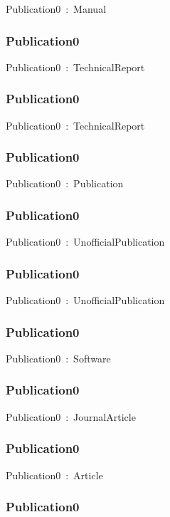 \documentclass{article}
\begin{document}
Publication0~:~Manual

\subsubsection*{Publication0}

Publication0~:~TechnicalReport

\subsubsection*{Publication0}

Publication0~:~TechnicalReport

\subsubsection*{Publication0}

Publication0~:~Publication

\subsubsection*{Publication0}

Publication0~:~UnofficialPublication

\subsubsection*{Publication0}

Publication0~:~UnofficialPublication

\subsubsection*{Publication0}

Publication0~:~Software

\subsubsection*{Publication0}

Publication0~:~JournalArticle

\subsubsection*{Publication0}

Publication0~:~Article

\subsubsection*{Publication0}
\end{document}
